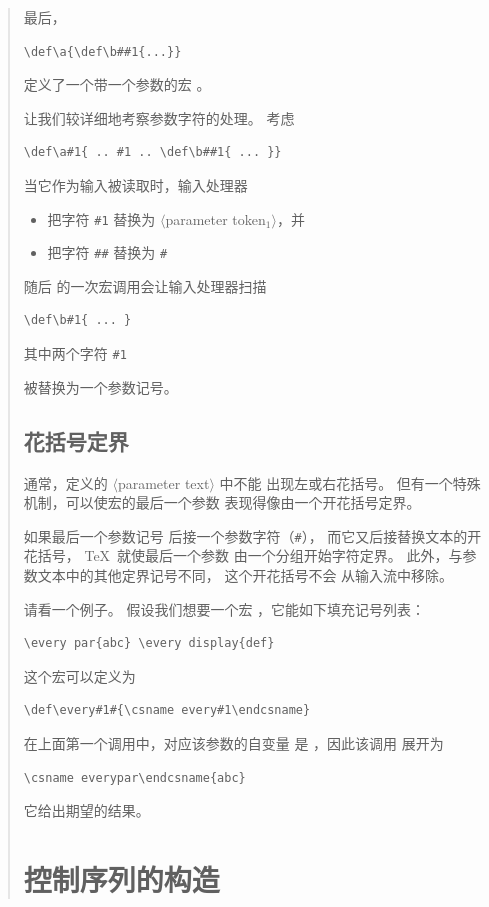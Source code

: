 \documentclass[a4paper]{rapport3}
\def\gr#1{$\langle$#1$\rangle$}\def\key#1{{\tt#1}}
\def\alt{}\def\altt{}%
\newenvironment{disp}{\begin{quotation}}{\end{quotation}}
\begin{document}
\begin{disp}
最后，
\begin{verbatim}
\def\a{\def\b##1{...}}
\end{verbatim}
定义了一个带一个参数的宏 。

让我们较详细地考察参数字符的处理。
考虑 \begin{verbatim}
\def\a#1{ .. #1 .. \def\b##1{ ... }}
\end{verbatim}
当它作为输入被读取时，输入处理器
\begin{itemize}
\item 把字符 \verb>#1> 替换为 \gr{parameter token$_1$}，并
\item 把字符 \verb>##> 替换为 \verb>#>\end{itemize}
随后  的一次宏调用会让输入处理器扫描
\begin{verbatim}
\def\b#1{ ... }
\end{verbatim}
其中两个字符 \verb>#1>
\alt
被替换为一个参数记号。

\subsection{花括号定界}

通常，定义的 \gr{parameter text} 中不能
出现左或右花括号。
但有一个特殊机制，可以使宏的最后一个参数
表现得像由一个开花括号定界。

如果最后一个参数记号
后接一个参数字符（\verb>#>），
而它又后接替换文本的开花括号，
\TeX\ 就使最后一个参数
由一个分组开始字符定界。
此外，与参数文本中的其他定界记号不同，
这个开花括号不会
从输入流中移除。

请看一个例子。
假设我们想要一个宏
，它能如下填充记号列表：
\begin{verbatim}
\every par{abc} \every display{def}
\end{verbatim}
这个宏可以定义为
\begin{verbatim}
\def\every#1#{\csname every#1\endcsname}
\end{verbatim}
在上面第一个调用中，对应该参数的自变量
是 ，因此该调用
展开为
\begin{verbatim}
\csname everypar\endcsname{abc}
\end{verbatim}
它给出期望的结果。


\section{控制序列的构造}
\label{cs:name}


\end{disp}
\end{document}
